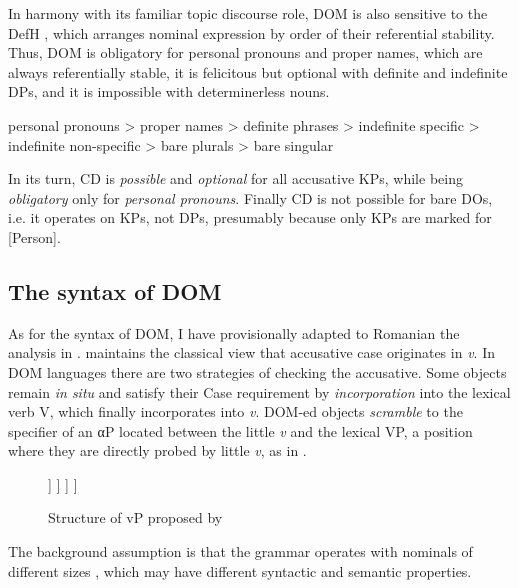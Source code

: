 \documentclass[output=paper,colorlinks,citecolor=brown,nonflat]{langsci/langscibook}
\begin{document}
In harmony with its familiar topic discourse role, DOM is also sensitive to the DefH , which arranges nominal expression by order of their referential stability. Thus, DOM is obligatory for personal pronouns and proper names, which are always referentially stable, it is felicitous but optional with definite and indefinite DPs, and it is impossible with determinerless nouns.

\ea%
      \label{ex:cornilescu:21}
       personal pronouns > proper names > definite phrases > indefinite specific > indefinite non-specific  > bare plurals > bare singular
      \z

In its turn, CD is \textit{possible} and \textit{optional} for all accusative KPs, while being \textit{obligatory} only for \textit{personal pronouns}. Finally CD is not possible for bare DOs, i.e. it operates on KPs, not DPs, presumably because only KPs are marked for [Person].

\subsection{{The} {syntax} {of} {DOM}}

As for the syntax of DOM, I have provisionally adapted to Romanian the analysis in \citet{López2012}. \citeauthor{López2012} maintains the classical view that accusative case originates in \textit{v}. In DOM languages there are two strategies of checking the accusative. Some objects remain \textit{in situ} and satisfy their Case requirement by \textit{incorporation} into the lexical verb V, which finally incorporates into \textit{v}. DOM-ed objects \textit{scramble} to the specifier of an αP located between the little \textit{v} and the lexical VP, a position where they are directly probed by little \textit{v}, as in .


\begin{figure}%
	\begin{forest}
		[\textit{v}P
			[Subject
			]
			[\textit{v}'
				[\textit{v}]
				[αP
					[α]
					[VP
						[V]
						[DO]
					]
				]
			]
		]
	\end{forest}
	\caption{\label{fig:cornilescu:4} Structure of vP proposed by \citep{López2012}}
\end{figure}

The background assumption is that the grammar operates with nominals of different sizes , which may have different syntactic and semantic properties.
\end{document}
